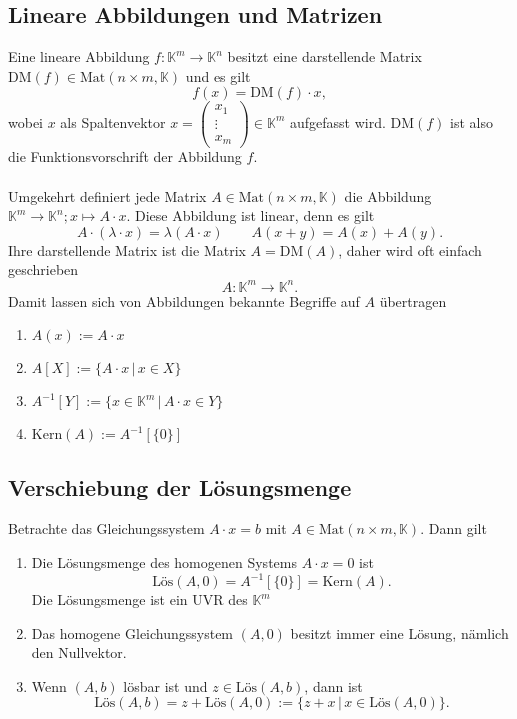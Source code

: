 \documentclass[a4paper,12pt]{article}
\begin{document}
\subsection{Lineare Abbildungen und Matrizen}
Eine lineare Abbildung $f:\mathbb{K}^{m}\rightarrow \mathbb{K}^{n}$ besitzt eine darstellende Matrix $\text{DM}\left(f\right) \in \text{Mat}\left(n\times m,\mathbb{K}\right)$ und es gilt
\[ 
        f\left(x\right)=\text{DM}\left(f\right)\cdot x
,\] 
wobei $x$ als Spaltenvektor $x=\left(\begin{matrix}
        x_1\\\vdots\\x_{m}
\end{matrix}\right) \in \mathbb{K}^{m}$ aufgefasst wird. $\text{DM}\left(f\right)$ ist also die Funktionsvorschrift der Abbildung $f$.\\\\
Umgekehrt definiert jede Matrix $A \in \text{Mat}\left(n\times m,\mathbb{K}\right)$ die Abbildung $\mathbb{K}^{m}\rightarrow \mathbb{K}^{n};x\mapsto A\cdot x$. Diese Abbildung ist linear, denn es gilt
\[ 
        A\cdot \left(\lambda \cdot x\right)=\lambda \left(A\cdot x\right)\qquad A\left(x+y\right)=A\left(x\right)+A\left(y\right)
.\] 
Ihre darstellende Matrix ist die Matrix $A=\text{DM}\left(A\right)$, daher wird oft einfach geschrieben
\[ 
        A:\mathbb{K}^{m}\rightarrow \mathbb{K}^{n}
.\] 
Damit lassen sich von Abbildungen bekannte Begriffe auf $A$ übertragen
\begin{enumerate}[label=--]
        \item $A\left(x\right):=A\cdot x$ 
        \item $A[X]:=\{A\cdot x\,|\, x \in X\}$ 
        \item $A^{-1}[Y]:=\{x \in \mathbb{K}^{m}\,|\, A\cdot x \in Y\}$ 
        \item $\text{Kern}\left(A\right):=A^{-1}[\{0\}]$ 
\end{enumerate}

\subsection{Verschiebung der Lösungsmenge}
Betrachte das Gleichungssystem $A\cdot x=b$ mit $A \in \text{Mat}\left(n\times m,\mathbb{K}\right)$. Dann gilt
\begin{enumerate}[label=(\alph*)]
        \item Die Lösungsmenge des homogenen Systems $A\cdot x=0$ ist
                \[ 
                        \text{Lös}\left(A,0\right)=A^{-1}[\{0\}]=\text{Kern}\left(A\right)
                .\] 
                Die Lösungsmenge ist ein UVR des $\mathbb{K}^{m}$ 
        \item Das homogene Gleichungssystem $\left(A,0\right)$ besitzt immer eine Lösung, nämlich den Nullvektor.
        \item Wenn $\left(A,b\right)$ lösbar ist und $z \in \text{Lös}\left(A,b\right)$, dann ist 
                \[ 
                        \text{Lös}\left(A,b\right)=z+\text{Lös}\left(A,0\right):=\{z+x\,|\, x \in \text{Lös}\left(A,0\right)\}
                .\] 
\end{enumerate}
\end{document}
